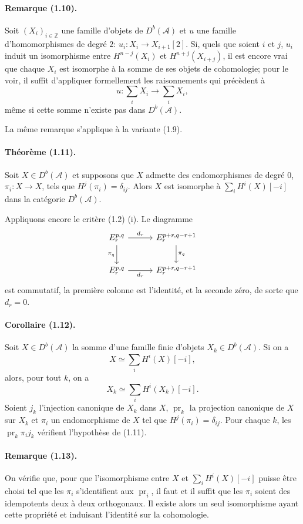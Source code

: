 \documentclass[10pt]{article}
\newcommand{\Acal}{\mathcal A}
\newcommand{\Z}{\mathbb Z}
\newcommand{\Db}{D^b}
\newcommand{\pr}{\operatorname{pr}}
\begin{document}
\paragraph{Remarque (1.10).} Soit $(X_i)_{i\in\Z}$ une famille d'objets de $\Db(\Acal)$ et $u$ une famille d'homomorphismes de degré $2$: $u_i:X_i\to X_{i+1}[2]$. Si, quels que soient $i$ et $j$, $u_i$ induit un isomorphisme entre $H^{n-j}(X_i)$ et $H^{n+j}(X_{i+j})$, il est encore vrai que chaque $X_i$ est isomorphe à la somme de ses objets de cohomologie; pour le voir, il suffit d'appliquer formellement les raisonnements qui précèdent à
\[
u:\sum_iX_i\longrightarrow\sum_iX_i,
\]
même si cette somme n'existe pas dans $\Db(\Acal)$.

La même remarque s'applique à la variante (1.9).

\paragraph{Théorème (1.11).} Soit $X\in\Db(\Acal)$ et supposons que $X$ admette des endomorphismes de degré $0$, $\pi_i:X\to X$, tels que $H^j(\pi_i)=\delta_{ij}$. Alors $X$ est isomorphe à $\sum_iH^i(X)[-i]$ dans la catégorie $\Db(\Acal)$.

Appliquons encore le critère (1.2) (i). Le diagramme
\[
\begin{tikzcd}[column sep=3.0em,row sep=2.2em]
E_r^{p,q} \arrow[r,"d_r"] \arrow[d,"\pi_q"'] & E_r^{p+r,q-r+1} \arrow[d,"\pi_q"]\\
E_r^{p,q} \arrow[r,"d_r"'] & E_r^{p+r,q-r+1}
\end{tikzcd}
\]
est commutatif, la première colonne est l'identité, et la seconde zéro, de sorte que $d_r=0$.

\paragraph{Corollaire (1.12).} Soit $X\in\Db(\Acal)$ la somme d'une famille finie d'objets $X_k\in\Db(\Acal)$. Si on a
\[
X\simeq\sum_iH^i(X)[-i],
\]
alors, pour tout $k$, on a
\[
X_k\simeq\sum_iH^i(X_k)[-i].
\]
Soient $j_k$ l'injection canonique de $X_k$ dans $X$, $\pr_k$ la projection canonique de $X$ sur $X_k$ et $\pi_i$ un endomorphisme de $X$ tel que $H^j(\pi_i)=\delta_{ij}$. Pour chaque $k$, les $\pr_k\pi_i j_k$ vérifient l'hypothèse de (1.11).

\paragraph{Remarque (1.13).} On vérifie que, pour que l'isomorphisme entre $X$ et $\sum_iH^i(X)[-i]$ puisse être choisi tel que les $\pi_i$ s'identifient aux $\pr_i$, il faut et il suffit que les $\pi_i$ soient des idempotents deux à deux orthogonaux. Il existe alors un seul isomorphisme ayant cette propriété et induisant l'identité sur la cohomologie.
\end{document}
